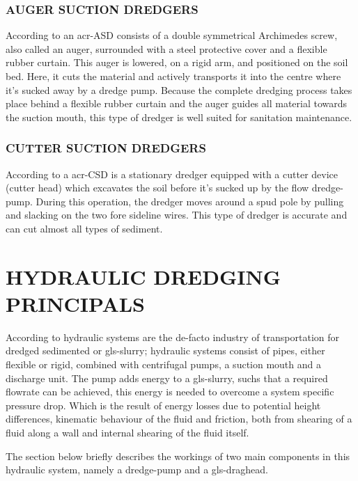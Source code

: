 \subsubsection{AUGER SUCTION DREDGERS}
According to \citet{vbko_vereniging_van_waterbouwers_in_bagger_kust_en_oeverwerken_voortgezette_1998} an
\gls{acr-ASD} consists of a double symmetrical Archimedes screw, also called an auger, surrounded with a steel
protective cover and a flexible rubber curtain. This auger is lowered, on a rigid arm, and positioned on the soil bed.
Here, it cuts the material and actively transports it into the centre where it's sucked away by a dredge pump. Because
the complete dredging process takes place behind a flexible rubber curtain and the auger guides all material towards the
suction mouth, this type of dredger is well suited for sanitation maintenance.

\subsubsection{CUTTER SUCTION DREDGERS}
According to \citet{vlasblom_designing_nodate} a \gls{acr-CSD} is a stationary dredger equipped with a cutter
device (cutter head)  which excavates the soil before it's sucked up by the flow dredge-pump. During this operation, the
dredger moves around a spud pole by pulling and slacking on the two fore sideline wires. This type of dredger is
accurate and can cut almost all types of sediment.


\section{HYDRAULIC DREDGING PRINCIPALS}
According to \citet{van_den_berg_ihc_2013} hydraulic systems are the de-facto industry of transportation for dredged
sedimented or \gls{gls-slurry}; hydraulic systems consist of pipes, either flexible or rigid, combined with centrifugal
pumps, a suction mouth and a discharge unit. The pump adds energy to a \gls{gls-slurry}, suchs that a required flowrate
can be achieved, this energy is needed to overcome a system specific pressure drop. Which is the result of energy losses
due to potential height differences, kinematic behaviour of the fluid and friction, both from shearing of a fluid along
a wall and internal shearing of the fluid itself.

The section below briefly describes the workings of two main components in this hydraulic system, namely a dredge-pump
and a \gls{gls-draghead}.

